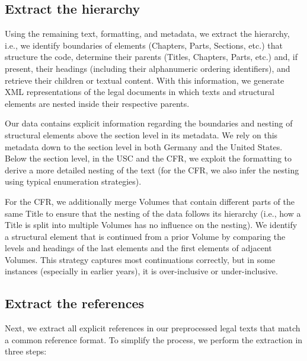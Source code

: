 \documentclass[utf8,sort&compress,numbers,square,table,hidelinks]{frontiers_suppmat} %
\begin{document}
\vspace*{6pt}
\subsection{Extract the hierarchy}

Using the remaining text, formatting, and metadata, 
we extract the hierarchy, i.e., 
we identify boundaries of elements (Chapters, Parts, Sections, etc.) that structure the code, 
determine their parents (Titles, Chapters, Parts, etc.) and, 
if present, their headings (including their alphanumeric ordering identifiers),
and retrieve their children or textual content. 
With this information, 
we generate XML representations of the legal documents
in which texts and structural elements are nested inside their respective parents.

Our data contains explicit information regarding the boundaries and nesting of structural elements above the section level in its metadata.
We rely on this metadata down to the section level in both Germany
and the United States.
Below the section level, in the USC and the CFR, we exploit the formatting to derive a more detailed nesting of the text (for the CFR, we  also infer the nesting using typical enumeration strategies).

For the CFR, we additionally merge Volumes that contain different parts of the same Title to ensure that the nesting of the data follows its hierarchy (i.e., how a Title is split into multiple Volumes has no influence on the nesting).
We identify a structural element that is continued from a prior Volume by comparing the levels and headings of the last elements and the first elements of adjacent Volumes. 
This strategy captures most continuations correctly, but in some instances (especially in earlier years), it is over-inclusive or under-inclusive.

\subsection{Extract the references}

Next, we extract all explicit references in our preprocessed legal texts that match a common reference format.
To simplify the process, we perform the extraction in three steps:
\end{document}

